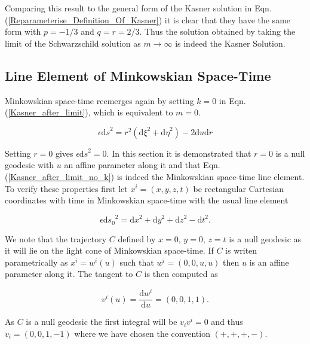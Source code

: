 \noindent Comparing this result to the general form of the Kasner solution in Eqn.(\ref{Reparameterise_Definition_Of_Kasner}) it is clear that they have the same form with $p=-1/3$ and $q=r=2/3$. Thus the solution obtained by taking the limit of the Schwarzschild solution as $m \rightarrow \infty$ is indeed the Kasner Solution. 

\subsection{Line Element of Minkowskian Space-Time}

Minkowskian space-time reemerges again by setting $k = 0$ in Eqn.(\ref{Kasner_after_limit}), which is equivalent to $m = 0$. 

\begin{equation}\label{Kasner_after_limit_no_k}
\epsilon {\mathrm{d}s}^2 = r^2 ({\mathrm{d}\xi}^2 + {\mathrm{d}\eta}^2) - 2 {\mathrm{d}u}{\mathrm{d}r}
\end{equation}

\noindent Setting $r = 0$ gives $\epsilon {\mathrm{d}s}^2 = 0$. In this section it is demonstrated that $r = 0$ is a null geodesic with $u$ an affine parameter along it and that Eqn.(\ref{Kasner_after_limit_no_k}) is indeed the Minkowskian space-time line element. To verify these properties first let $x^i = (x,y,z,t)$ be rectangular Cartesian coordinates with time in Minkowskian space-time with the usual line element

\begin{equation*} 
\epsilon {\mathrm{d}s_0}^2 = {\mathrm{d}x}^2 + {\mathrm{d}y}^2 + {\mathrm{d}z}^2 - {\mathrm{d}t}^2.
\end{equation*} 

\noindent We note that the trajectory $C$  defined by $x = 0$, $y = 0$, $z = t$ is a null geodesic as it will lie on the light cone of Minkowskian space-time. If $C$ is writen parametrically as $x^i = w^i (u)$ such that $w^i = (0,0,u,u)$ then $u$ is an affine parameter along it. The tangent to $C$ is then computed as

\begin{equation*} 
v^i (u) = \frac{\mathrm{d} w^i}{\mathrm{d}u} = (0,0,1,1).
\end{equation*} 

\noindent As $C$ is a null geodesic the first integral will be $v_i v^i = 0$ and thus $v_i = (0,0,1,-1)$ where we have chosen the convention $(+,+,+,-)$. 

